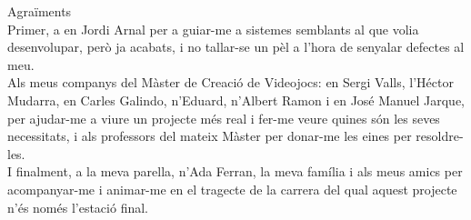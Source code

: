 \newpage

{\LARGE Agraïments}
\\

Primer, a en Jordi Arnal per a guiar-me a sistemes semblants al que volia desenvolupar, però ja acabats, i no tallar-se un pèl a l'hora de senyalar defectes al meu.
\\

Als meus companys del Màster de Creació de Videojocs: en Sergi Valls, l'Héctor Mudarra, en Carles Galindo, n'Eduard, n'Albert Ramon i en José Manuel Jarque, per ajudar-me a viure un projecte més real i fer-me veure quines són les seves necessitats, i als professors del mateix Màster per donar-me les eines per resoldre-les.
\\

I finalment, a la meva parella, n'Ada Ferran, la meva família i als meus amics per acompanyar-me i animar-me en el tragecte de la carrera del qual aquest projecte n'és només l'estació final.